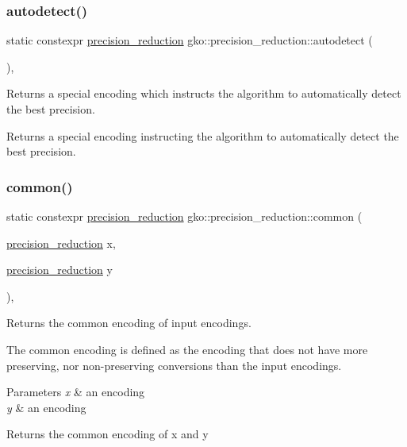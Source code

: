 \subsubsection{\texorpdfstring{autodetect()}{autodetect()}}
{\footnotesize\ttfamily static constexpr \hyperlink{classgko_1_1precision__reduction}{precision\+\_\+reduction} gko\+::precision\+\_\+reduction\+::autodetect (\begin{DoxyParamCaption}{ }\end{DoxyParamCaption})\hspace{0.3cm}{\ttfamily [static]}, {\ttfamily [noexcept]}}



Returns a special encoding which instructs the algorithm to automatically detect the best precision. 

\begin{DoxyReturn}{Returns}
a special encoding instructing the algorithm to automatically detect the best precision. 
\end{DoxyReturn}
\mbox{\label{classgko_1_1precision__reduction_aa0ac7ac5a2807f3a0e9bd245273be388}} 
\subsubsection{\texorpdfstring{common()}{common()}}
{\footnotesize\ttfamily static constexpr \hyperlink{classgko_1_1precision__reduction}{precision\+\_\+reduction} gko\+::precision\+\_\+reduction\+::common (\begin{DoxyParamCaption}\item[{\hyperlink{classgko_1_1precision__reduction}{precision\+\_\+reduction}}]{x,  }\item[{\hyperlink{classgko_1_1precision__reduction}{precision\+\_\+reduction}}]{y }\end{DoxyParamCaption})\hspace{0.3cm}{\ttfamily [static]}, {\ttfamily [noexcept]}}



Returns the common encoding of input encodings. 

The common encoding is defined as the encoding that does not have more preserving, nor non-\/preserving conversions than the input encodings.


\begin{DoxyParams}{Parameters}
{\em x} & an encoding \\
\hline
{\em y} & an encoding\\
\hline
\end{DoxyParams}
\begin{DoxyReturn}{Returns}
the common encoding of {\ttfamily x} and {\ttfamily y} 
\end{DoxyReturn}


